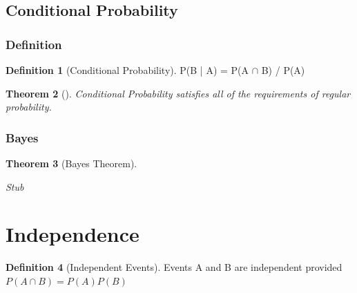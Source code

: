 \documentclass[10pt,]{book}
\theoremstyle{plain}
\newtheorem{theorem}{Theorem}[section]
\theoremstyle{definition}
\newtheorem{definition}[theorem]{Definition}
\theoremstyle{definition}
\numberwithin{equation}{section}
\begin{document}
\subsection[Conditional Probability]{Conditional Probability}\label{subsection-12}
\typeout{************************************************}
\typeout{************************************************}
\subsubsection[Definition]{Definition}\label{subsection-13}
\begin{definition}[Conditional Probability]\label{definition-6}
P(B | A) = P(A \(\cap\) B) / P(A)\end{definition}
\begin{theorem}[]\label{theorem-20}
Conditional Probability satisfies all of the requirements of regular probability.\end{theorem}
\typeout{************************************************}
\typeout{************************************************}
\subsubsection[Bayes]{Bayes}\label{subsection-14}
\begin{theorem}[Bayes Theorem]\label{theorem-21}

		Stub
		\end{theorem}
\typeout{************************************************}
\typeout{************************************************}
\section[Independence]{Independence}\label{section-15}
\begin{definition}[Independent Events]\label{definition-7}
Events A and B are independent provided \(P(A \cap B) = P(A) P(B)\)\end{definition}
\typeout{************************************************}
\typeout{************************************************}
\end{document}
